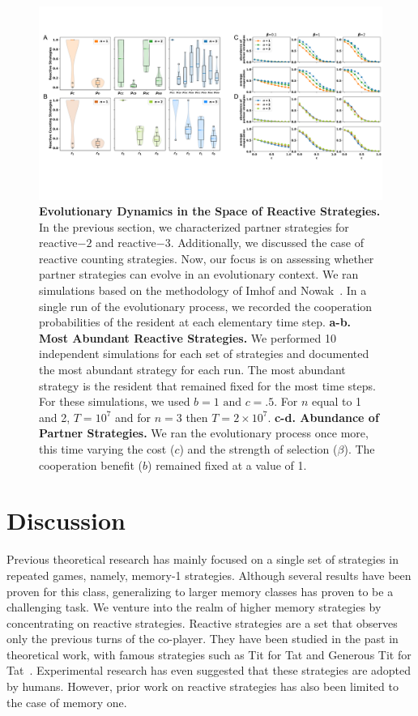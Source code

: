 \documentclass{article}
\theoremstyle{definition}
\begin{document}
\begin{figure}[htbp]
  \centering
  \includegraphics[width=\textwidth]{figures/evolutionary_results.pdf}
  \caption{\textbf{Evolutionary Dynamics in the Space of Reactive Strategies.}
  In the previous section, we characterized partner strategies for
  reactive$-2$ and reactive$-3$. Additionally, we discussed the case of reactive
  counting strategies. Now, our focus is on assessing whether partner strategies
  can evolve in an evolutionary context. We ran simulations based on the
  methodology of Imhof and Nowak~\cite{imhof:royal:2010}. In a single run of the
  evolutionary process, we recorded the cooperation probabilities of the
  resident at each elementary time step. \textbf{a-b. Most Abundant Reactive
  Strategies.} We performed 10 independent simulations for each set of
  strategies and documented the most abundant strategy for each run. The most
  abundant strategy is the resident that remained fixed for the most time steps.
  For these simulations, we used \(b=1 \text{ and } c=.5\). For $n$ equal to 1
  and 2, \(T= 10 ^ 7\) and for $n=3$ then \(T= 2 \times10 ^ 7\).
  \textbf{c-d. Abundance of Partner Strategies.}
  We ran the evolutionary process once more, this time varying the cost ($c$)
  and the strength of selection ($\beta$). The cooperation benefit ($b$)
  remained fixed at a value of 1.}\label{fig:evolutionary_results}
\end{figure}


\section{Discussion}

Previous theoretical research has mainly focused on a single set of strategies
in repeated games, namely, memory-1 strategies. Although several results have
been proven for this class, generalizing to larger memory classes has proven to
be a challenging task. We venture into the realm of higher memory strategies by
concentrating on reactive strategies. Reactive strategies are a set that
observes only the previous turns of the co-player. They have been studied in the
past in theoretical work, with famous strategies such as Tit for Tat and
Generous Tit for Tat~\cite{nowak:Nature:1993}. Experimental research has even
suggested that these strategies are adopted by humans. However, prior work on
reactive strategies has also been limited to the case of memory one.
\end{document}
